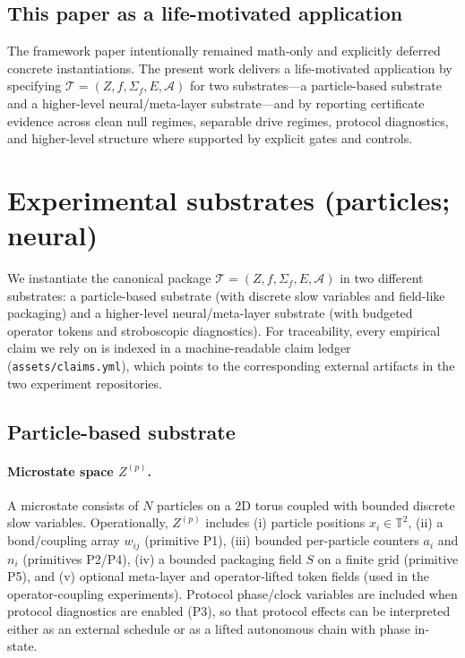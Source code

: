 \documentclass[11pt]{article}
\newcommand{\Tpkg}{\mathcal T}
\newcommand{\Audit}{\mathcal A}
\newcommand{\Sig}{\Sigma}
\begin{document}
\subsection{This paper as a life-motivated application}\label{sec:framework:promise}
The framework paper \citep{tsiokos2026sixbirds} intentionally remained math-only and explicitly deferred concrete instantiations. The present work delivers a life-motivated application by specifying $\Tpkg=(Z,f,\Sig_f,E,\Audit)$ for two substrates---a particle-based substrate and a higher-level neural/meta-layer substrate---and by reporting certificate evidence across clean null regimes, separable drive regimes, protocol diagnostics, and higher-level structure where supported by explicit gates and controls.

\section{Experimental substrates (particles; neural)}\label{sec:instantiations}
We instantiate the canonical package $\Tpkg=(Z,f,\Sig_f,E,\Audit)$ in two different substrates: a particle-based substrate (with discrete slow variables and field-like packaging) and a higher-level neural/meta-layer substrate (with budgeted operator tokens and stroboscopic diagnostics). For traceability, every empirical claim we rely on is indexed in a machine-readable claim ledger (\texttt{assets/claims.yml}), which points to the corresponding external artifacts in the two experiment repositories.

\subsection{Particle-based substrate}\label{sec:inst:particles}
\paragraph{Microstate space $Z^{(p)}$.}
A microstate consists of $N$ particles on a 2D torus coupled with bounded discrete slow variables. Operationally, $Z^{(p)}$ includes (i) particle positions $x_i\in\mathbb T^2$, (ii) a bond/coupling array $w_{ij}$ (primitive P1), (iii) bounded per-particle counters $a_i$ and $n_i$ (primitives P2/P4), (iv) a bounded packaging field $S$ on a finite grid (primitive P5), and (v) optional meta-layer and operator-lifted token fields (used in the operator-coupling experiments). Protocol phase/clock variables are included when protocol diagnostics are enabled (P3), so that protocol effects can be interpreted either as an external schedule or as a lifted autonomous chain with phase in-state.
\end{document}
